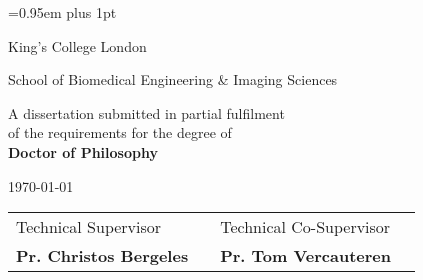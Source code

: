 \begin{titlepage}

\pagestyle{empty}


\vspace*{1.5cm}

\begin{center}
	{\LARGE{\theauthor}\par}
\end{center}
\vspace{0.6cm}
\begin{center}
        {\huge\baselineskip=0.95em plus 1pt \expandafter{
        \textbf{\thetitle}
        \par}}
\end{center}


\vspace{3cm}

\begin{center}
	\LARGE{\expandafter{\textrm{King's College London}}}\par
	\expandafter{\Large{School of Biomedical Engineering \& Imaging Sciences}\par}
\end{center}

\vspace{1.5cm}

\begin{center}
	A dissertation submitted in partial fulfilment 
	\\
	of the requirements for the degree of
	\\ 
	\textbf{Doctor of Philosophy}	
\end{center}

\vspace{0.2cm}
\begin{center}
	\today
\end{center}

\vspace{1.0cm}

\begin{center}
\begin{tabular}{l p{3.3cm} l l}
	
Technical Supervisor & & Technical Co-Supervisor \\
\textbf{Pr. Christos Bergeles} & & \textbf{Pr. Tom Vercauteren}
	
\end{tabular}
\end{center}

\end{titlepage} 